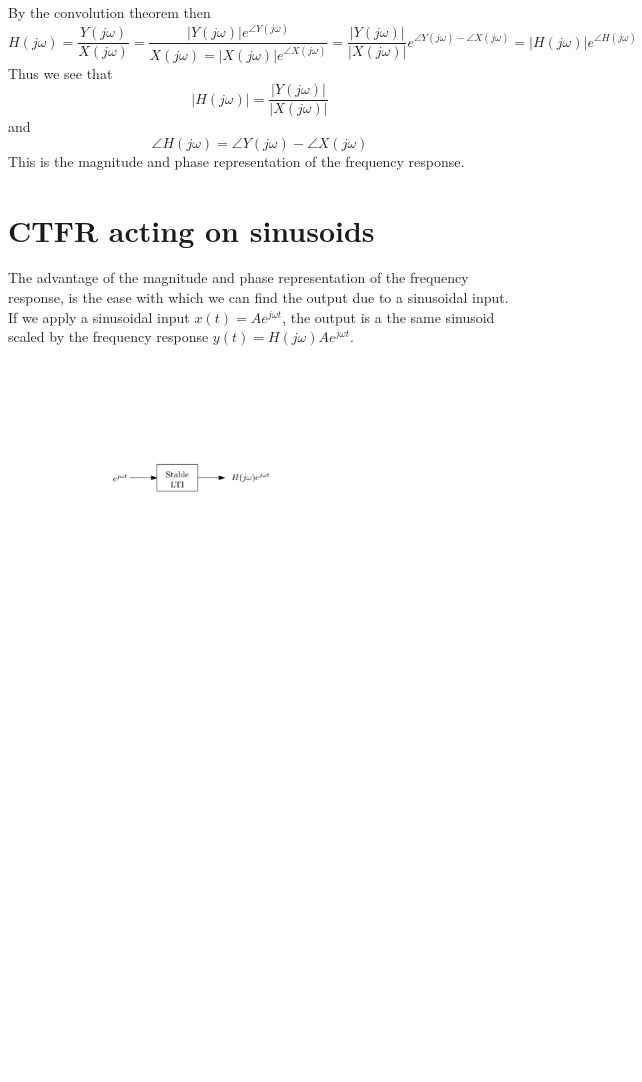 By the convolution theorem then
  \[
  H(j\omega) = \frac{Y(j\omega)}{X(j\omega)} = \frac{|Y(j\omega)|e^{\angle Y(j\omega)}}{X(j\omega) = |X(j\omega)|e^{\angle X(j\omega)}} = \frac{|Y(j\omega)|}{|X(j\omega)|}e^{\angle Y(j\omega) - \angle X(j\omega)} = |H(j\omega)|e^{\angle H(j\omega)}
  \]
  Thus we see that
  \[
  |H(j\omega)| = \frac{|Y(j\omega)|}{|X(j\omega)|}
  \]
  and
  \[
  \angle H(j\omega) = \angle Y(j\omega) - \angle X(j\omega)
  \]
  This is the magnitude and phase representation of the frequency response.
  
\section{CTFR acting on sinusoids}

The advantage of the magnitude and phase representation of the frequency response, is the ease with which we can find the output due to a sinusoidal input. If we apply a sinusoidal input $x(t) = A e^{j\omega t}$, the output is a the same sinusoid scaled by the frequency response $y(t) = H(j\omega) A e^{j\omega t}$.

\begin{center}
  \includegraphics[scale=1]{graphics/18-ct-fr.pdf}
\end{center}

